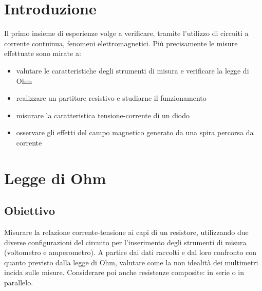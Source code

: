\documentclass[a4paper]{article}
\begin{document}
\section{Introduzione}
Il primo insieme di esperienze volge a verificare, tramite l'utilizzo di circuiti a
corrente contuinua, fenomeni elettromagnetici. Più precisamente le misure effettuate sono mirate a:
\begin{itemize}
	\item valutare le caratteristiche degli strumenti di misura e verificare la legge di Ohm
	\item realizzare un partitore resistivo e studiarne il funzionamento
	\item misurare la caratteristica tensione-corrente di un diodo
	\item osservare gli effetti del campo magnetico generato da una spira percorsa da corrente

\end{itemize}
\section{Legge di Ohm}
\subsection{Obiettivo}
Misurare la relazione corrente-tensione ai capi di un resistore, utilizzando due diverse configurazioni del circuito per l'inserimento degli strumenti di misura
(voltometro e amperometro). A partire dai dati raccolti e dal loro confronto con quanto previsto dalla legge di Ohm, valutare come la non idealità dei multimetri incida sulle misure.
Considerare poi anche resistenze composite: in serie o in parallelo.
\end{document}
